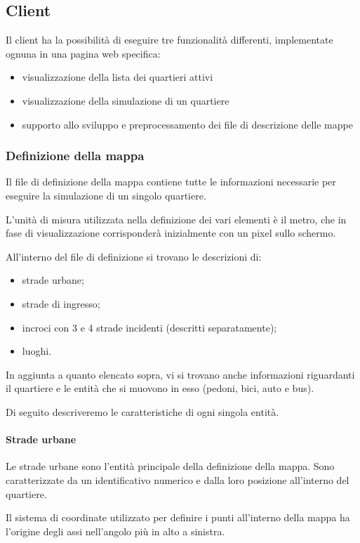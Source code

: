\subsection{Client}
Il client ha la possibilità di eseguire tre funzionalità differenti,
implementate ognuna in una pagina web specifica:
\begin{itemize}
	\item visualizzazione della lista dei quartieri attivi
	\item visualizzazione della simulazione di un quartiere
	\item supporto allo sviluppo e preprocessamento dei file di descrizione delle
	mappe
\end{itemize}

\subsubsection{Definizione della mappa}
Il file di definizione della mappa contiene tutte le informazioni necessarie per
eseguire la simulazione di un singolo quartiere. 

L'unità di misura utilizzata nella definizione dei vari elementi è il metro, che
in fase di visualizzazione corrisponderà inizialmente con un pixel sullo
schermo.

All'interno del file di definizione si trovano le descrizioni di:
\begin{itemize}
	\item strade urbane;
	\item strade di ingresso;
	\item incroci con 3 e 4 strade incidenti (descritti separatamente);
	\item luoghi.
\end{itemize}

In aggiunta a quanto elencato sopra, vi si trovano anche informazioni
riguardanti il quartiere e le entità che si muovono in esso (pedoni, bici, auto
e bus).

Di seguito descriveremo le caratteristiche di ogni singola entità.

\paragraph*{Strade urbane}
Le strade urbane sono l'entità principale della definizione della mappa. Sono
caratterizzate da un identificativo numerico e dalla loro posizione all'interno
del quartiere. 

Il sistema di coordinate utilizzato per definire i punti all'interno della mappa
ha l'origine degli assi nell'angolo più in alto a sinistra.

